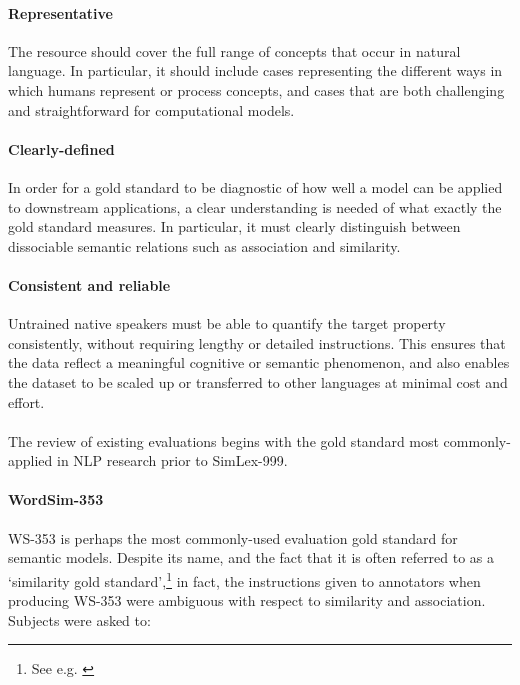 \paragraph{Representative} The resource should cover the full range of concepts that occur in natural language. In particular, it should include cases representing the different ways in which humans represent or process concepts, and cases that are both challenging and straightforward for computational models. 

\paragraph{Clearly-defined} In order for a gold standard to be diagnostic of how well a model can be applied to downstream applications, a clear understanding is needed of what exactly the gold standard measures. In particular, it must clearly distinguish between dissociable semantic relations such as association and similarity.

\paragraph{Consistent and reliable} Untrained native speakers must be able to quantify the target property consistently, without requiring lengthy or detailed instructions. This ensures that the data reflect a meaningful cognitive or semantic phenomenon, and also enables the dataset to be scaled up or transferred to other languages at minimal cost and effort.

\paragraph{}The review of existing evaluations begins with the gold standard most commonly-applied in NLP research prior to SimLex-999. 

\noindent 

\paragraph{\bf WordSim-353}WS-353 \citep{finkelstein2001placing} is perhaps the most commonly-used evaluation gold standard for semantic models. Despite its name, and the fact that it is often referred to as a `similarity gold standard',\footnote{See e.g. \cite{huang2012improving,bansal2014tailoring}} in fact, the instructions given to annotators when producing WS-353 were ambiguous with respect to similarity and association. Subjects were asked to: 

